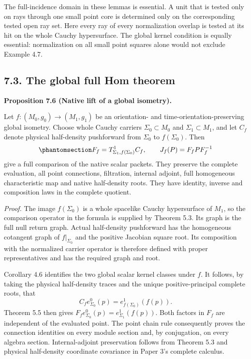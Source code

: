\documentclass[
  english,
  11pt,
  reqno]{amsart}
\makeatletter
\newcommand{\paperdisplaynext}{%
  \let\paper@savedstartsection\@startsection
  \def\@startsection##1##2##3##4##5##6{%
    \let\@startsection\paper@savedstartsection
    \@tempskipa ##5\relax
    \ifdim\@tempskipa<\z@
      \def\paper@afterskip{.35\baselineskip}%
    \else
      \def\paper@afterskip{##5}%
    \fi
    \@startsection{##1}{##2}{##3}{##4}{\paper@afterskip}{##6}}}
\newcommand{\paperdisplaysection}{\paperdisplaynext\subsection}
\newcommand{\pandocstatementheading}[1]{%
  \par\if@nobreak\else
    \addpenalty{\@beginparpenalty}%
    \addvspace{.5\baselineskip plus .2\baselineskip minus .2\baselineskip}%
  \fi
  {\normalfont\bfseries #1\par}%
  \nobreak\@afterindenttrue\@afterheading
}
\makeatother
\begin{document}
The full-incidence domain in these lemmas is essential. A unit that is
tested only on rays through one small point core is determined only on
the corresponding tested open ray set. Here every ray of every
normalization overlap is tested at its hit on the whole Cauchy
hypersurface. The global kernel condition is equally essential:
normalization on all small point squares alone would not exclude Example
4.7.

\protect{}\label{sec:global-full-hom-proof}
\paperdisplaysection{7.3. The global full Hom
theorem}\label{the-global-full-hom-theorem}
\pandocstatementheading{\protect{}\label{prop:global-native-isometry-lift}Proposition 7.6 (Native lift of a global isometry).}

Let \(f:(M_0,g_0)\to(M_1,g_1)\) be an orientation- and
time-orientation-preserving global isometry. Choose whole Cauchy
carriers \(\Sigma_0\subset M_0\) and \(\Sigma_1\subset M_1\), and let
\(C_f\) denote physical half-density pushforward from \(\Sigma_0\) to
\(f(\Sigma_0)\). Then
\begin{equation}\protect\phantomsection\label{eq:global-native-isometry-lift}{
F_f=T^1_{\Sigma_1,f(\Sigma_0)}C_f,
\qquad
J_f(P)=F_f P F_f^{-1}
}\end{equation} give a full comparison of the native scalar packets.
They preserve the complete evaluation, all point connections,
filtration, internal adjoint, full homogeneous characteristic map and
native half-density roots. They have identity, inverse and composition
laws in the complete quotient.

\emph{Proof.} The image \(f(\Sigma_0)\) is a whole spacelike Cauchy
hypersurface of \(M_1\), so the comparison operator in the formula is
supplied by Theorem 5.3. Its graph is the full null return graph. Actual
half-density pushforward has the homogeneous cotangent graph of
\(f|_{\Sigma_0}\) and the positive Jacobian square root. Its composition
with the normalized carrier operator is therefore defined with proper
representatives and has the required graph and root.

Corollary 4.6 identifies the two global scalar kernel classes under
\(f\). It follows, by taking the physical half-density traces and the
unique positive-principal complete roots, that \[
C_f e_{\Sigma_0}^0(p)
 =e^1_{f(\Sigma_0)}(f(p)).
\] Theorem 5.5 then gives
\(F_f e^0_{\Sigma_0}(p)=e^1_{\Sigma_1}(f(p))\). Both factors in \(F_f\)
are independent of the evaluated point. The point chain rule
consequently proves the connection identities on every module section
and, by conjugation, on every algebra section. Internal-adjoint
preservation follows from Theorem 5.3 and physical half-density
coordinate covariance in Paper 3's complete calculus.
\end{document}
